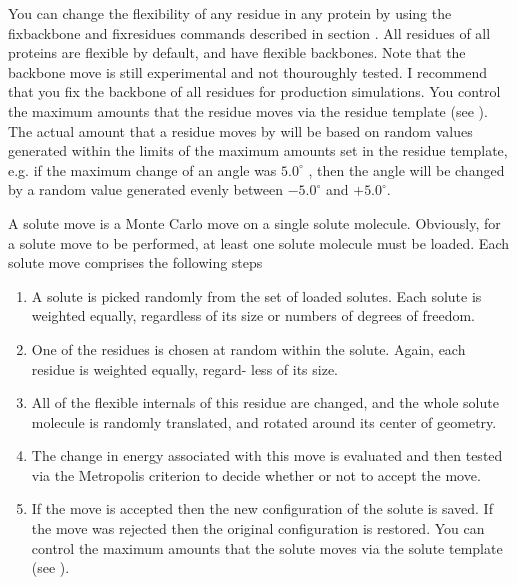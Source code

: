 \documentclass[letterpaper,10pt,english]{sphinxmanual}
\begin{document}
You can change the flexibility of any residue in any protein by using the fixbackbone and fixresidues commands described in section {\hyperref[\detokenize{protoms:misccmd}]{}}. All residues of all proteins are flexible by default, and have flexible backbones. Note that the backbone move is still experimental and not thouroughly tested. I recommend that you fix the backbone of all residues for production simulations. You control the maximum amounts that the residue moves via the residue template (see {\hyperref[\detokenize{protoms:temref}]{}}). The actual amount that a residue moves by will be based on random values generated within the limits of the maximum amounts set in the residue template, e.g. if the maximum change of an angle was \(5.0^\circ\) , then the angle will be changed by a random value generated evenly between \(-5.0^\circ\) and \(+5.0^\circ\).

\ignorespaces 
{}
A solute move is a Monte Carlo move on a single solute molecule. Obviously, for a solute move to be performed, at least one solute molecule must be loaded. Each solute move comprises the following steps
\begin{enumerate}
\item {} 
A solute is picked randomly from the set of loaded solutes. Each solute is weighted equally, regardless of its size or numbers of degrees of freedom.

\item {} 
One of the residues is chosen at random within the solute. Again, each residue is weighted equally, regard- less of its size.

\item {} 
All of the flexible internals of this residue are changed, and the whole solute molecule is randomly translated, and rotated around its center of geometry.

\item {} 
The change in energy associated with this move is evaluated and then tested via the Metropolis criterion to decide whether or not to accept the move.

\item {} 
If the move is accepted then the new configuration of the solute is saved. If the move was rejected then the original configuration is restored. You can control the maximum amounts that the solute moves via the solute template (see {\hyperref[\detokenize{protoms:temref}]{}}).

\end{enumerate}
\end{document}
